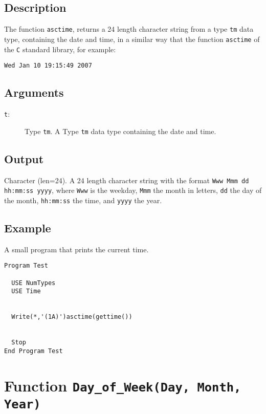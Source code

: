 \subsection{Description}

The function \texttt{asctime}, returns a 24 length character string
from a type \texttt{tm} data type, containing the date and time, in a
similar way that the function \texttt{asctime} of the \texttt{C}
standard library, for example:
\begin{verbatim}
Wed Jan 10 19:15:49 2007
\end{verbatim}

\subsection{Arguments}

\begin{description}
\item[\texttt{t}: ] Type \texttt{tm}. A Type \texttt{tm} data type
  containing the date and time.
\end{description}

\subsection{Output}

Character (len=24). A 24 length character string with the format
\texttt{Www Mmm dd hh:mm:ss yyyy}, where \texttt{Www} is the weekday,
\texttt{Mmm} the month in letters, \texttt{dd} the day of the month,
\texttt{hh:mm:ss} the time, and \texttt{yyyy} the year. 

\subsection{Example}

A small program that prints the current time.

\begin{verbatim}
Program Test

  USE NumTypes
  USE Time


  Write(*,'(1A)')asctime(gettime())


  Stop
End Program Test
\end{verbatim}

\section{Function \texttt{Day\_of\_Week(Day, Month, Year)}}

